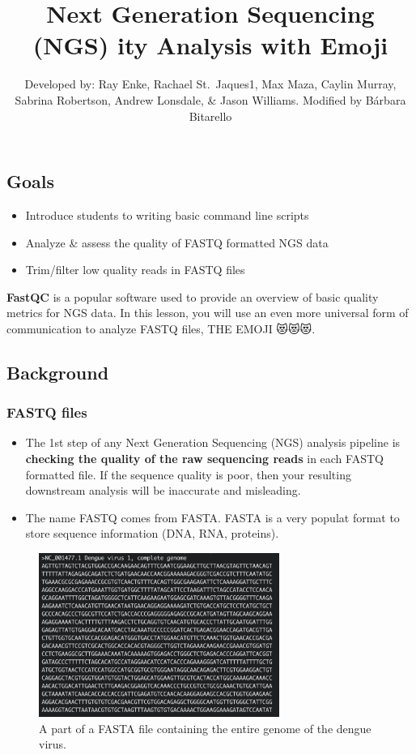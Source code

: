 \documentclass[
]{article}
\title{Next Generation Sequencing (NGS) ity Analysis with Emoji}
\subtitle{Developed by: Ray Enke, Rachael St.~Jaques1, Max Maza, Caylin
Murray, Sabrina Robertson, Andrew Lonsdale, \& Jason Williams. Modified
by Bárbara Bitarello}
\author{}
\date{\vspace{-2.5em}}
\providecommand{\tightlist}{%
  \setlength{\itemsep}{0pt}\setlength{\parskip}{0pt}}
\begin{document}
\maketitle

{
\setcounter{tocdepth}{2}
\tableofcontents
}
\hypertarget{goals}{%
\subsection{Goals}\label{goals}}

\begin{itemize}
\tightlist
\item
  Introduce students to writing basic command line scripts
\item
  Analyze \& assess the quality of FASTQ formatted NGS data
\item
  Trim/filter low quality reads in FASTQ files
\end{itemize}

\textbf{FastQC} is a popular software used to provide an overview of
basic quality metrics for NGS data. In this lesson, you will use an even
more universal form of communication to analyze FASTQ files, THE EMOJI
😻😻😻.

\hypertarget{background}{%
\subsection{Background}\label{background}}

\hypertarget{fastq-files}{%
\subsubsection{FASTQ files}\label{fastq-files}}

\begin{itemize}
\item
  The 1st step of any Next Generation Sequencing (NGS) analysis pipeline
  is \textbf{checking the quality of the raw sequencing reads} in each
  FASTQ formatted file. If the sequence quality is poor, then your
  resulting downstream analysis will be inaccurate and misleading.
\item
  The name FASTQ comes from FASTA. FASTA is a very populat format to
  store sequence information (DNA, RNA, proteins).
\end{itemize}

\begin{figure}
\centering
\includegraphics[width=0.7\textwidth,height=\textheight]{images/fastafile.png}
\caption{A part of a FASTA file containing the entire genome of the
dengue virus.}
\end{figure}
\end{document}
